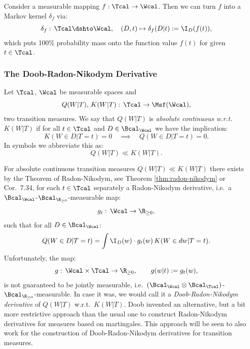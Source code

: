 \begin{Rem}
    Consider a measurable mapping $f: \Tcal \to \Wcal$. Then we can turn $f$ into a Markov kernel $\delta_f$ via:
    \[  \delta_f:\, \Tcal \dshto \Wcal, \quad (D,t) \mapsto \delta_f(D|t):= \I_D(f(t)),\]
    which puts 100\% probability mass onto the function value $f(t)$ for given $t \in \Tcal$.
\end{Rem}


\subsubsection{The Doob-Radon-Nikodym Derivative}


\begin{Def}
    Let $\Tcal$, $\Wcal$ be  measurable spaces and
    \[ Q(W|T),\,K(W|T):\, \Tcal \to \Msf(\Wcal),  \]
    two transition measures. 
    We say that $Q(W|T)$ is \emph{absolute continuous w.r.t.} $K(W|T)$ if for all $t \in \Tcal$ and $D \in \Bcal_\Wcal$ 
    we have the implication:
    \[ K(W \in D|T=t) =0 \quad \implies \quad Q(W \in D|T=t) =0.  \]
    In symbols we abbreviate this as:
    \[  Q(W|T) \ll K(W|T).\]
\end{Def}

\begin{Rem}
    For absolute continuous transition measures $Q(W|T) \ll K(W|T)$ there exists by the Theorem of Radon-Nikodym, see Theorem \ref{thm:radon-nikodym} or \cite{Kle20} Cor.\ 7.34,
    for each $t \in \Tcal$ separately a Radon-Nikodym derivative, i.e.\ a $\Bcal_\Wcal$-$\Bcal_{\R_{\ge0}}$-measurable map:
    \[ g_t:\, \Wcal \to \R_{\ge 0},\]
    such that for all $D \in \Bcal_\Wcal$:
    \[ Q(W \in D|T=t) = \int \I_D(w) \cdot g_t(w) \, K(W \in dw|T=t). \]
    Unfortunately, the map:
    \[  g:\, \Wcal \times \Tcal \to \R_{\ge0},\qquad g(w|t):=g_t(w),\]
    is not guaranteed to be jointly measurable, i.e.\ $(\Bcal_\Wcal\otimes\Bcal_\Tcal)$-$\Bcal_{\R_{\ge0}}$-measurable.
    In case it was, we would call it a \emph{Doob-Radon-Nikodym derivative} of  $Q(W|T)$ w.r.t.\ $K(W|T)$.
    Doob invented an alternative, but a bit more restrictive approach than the usual one
    to construct Radon-Nikodym derivatives for measures based on martingales.
    This approach will be seen to also work for the construction of Doob-Radon-Nikodym derivatives for transition measures.
\end{Rem}


